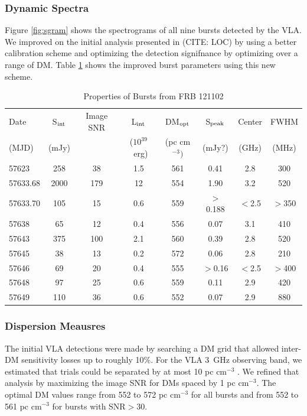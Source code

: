\documentclass[twocolumn]{aastex61}
\newcommand{\frb}{FRB 121102}
\begin{document}
\subsubsection{Dynamic Spectra}
\label{sec:spec}
Figure \ref{fig:sgram} shows the spectrograms of all nine bursts detected by the VLA. We improved on the initial analysis presented in (CITE: LOC) by using a better calibration scheme and optimizing the detection signifnance by optimizing over a range of DM. Table \ref{tab:spec} shows the improved burst parameters using this new scheme. 

\begin{table}
\caption{Properties of Bursts from \frb}
\centering
\begin{tabular}{lccccccc}
\hline
Date     & S$_{\rm{int}}$ & Image SNR & L$_{\rm{int}}$ & DM$_{\rm{opt}}$ & S$_{\rm{peak}}$ & Center & FWHM \\
(MJD)    & (mJy) &  & ($10^{39}$\ erg) & (pc cm$^{-3})$ & (mJy?) & (GHz) & (MHz) \\ \hline
57623    & 258 & 38 & 1.5 & 561 & 0.41             & 2.8 & 300 \\
57633.68 & 2000 & 179 & 12 & 554 & 1.90           & 3.2 & 520 \\
57633.70\tablenotemark{a} & 105 & 15 & 0.6 & 559 & $>$0.188          & $<$2.5 & $>$350 \\
57638    & 65  & 12 & 0.4 & 556 & 0.07             & 3.1 & 410 \\
57643    & 375 & 100 & 2.1 & 560 & 0.39            & 2.8 & 520 \\
57645    & 38  & 13 & 0.2 & 572 & 0.06             & 2.8 & 210 \\
57646\tablenotemark{a}    & 69  & 20 & 0.4 & 555 & $>$0.16          & $<$2.5 & $>$400 \\
57648\tablenotemark{b}    & 97 & 25 & 0.6 & 559 & 0.11 & 2.9 & 420 \\
57649    & 110 & 36 & 0.6 & 552 & 0.07             & 2.9 & 880 \\ \hline
\end{tabular}
\label{tab:spec}
\end{table} 

\subsubsection{Dispersion Meausres}
The initial VLA detections were made by searching a DM grid that allowed inter-DM sensitivity losses up to roughly 10\%. For the VLA 3~GHz observing band, we estimated that trials could be separated by at most 10 pc cm$^{-3}$ \citep{2003ApJ...596.1142C}. We refined that analysis by maximizing the image SNR for DMs spaced by 1 pc cm$^{-3}$. The optimal DM values range from 552 to 572 pc cm$^{-3}$ for all bursts and from 552 to 561 pc cm$^{-3}$ for bursts with SNR$>30$. 
\end{document}

